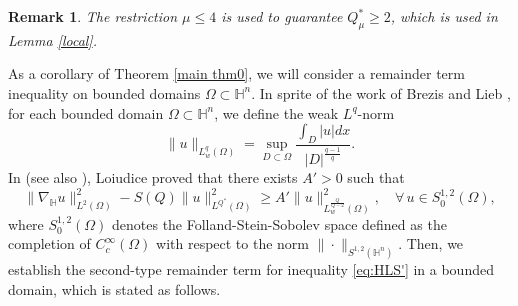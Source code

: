 \documentclass[11pt]{article}
\newtheorem{remark}{Remark}[section]
\begin{document}

\begin{remark}
{\rm The restriction $\mu\leq 4$ is used to guarantee $Q_\mu^*\geq 2$, which is used in Lemma \ref{local}.}
\end{remark}




As a corollary of Theorem \ref{main thm0}, we will consider a remainder term inequality on bounded domains $\Omega\subset \mathbb{H}^n$. In sprite of the work of Brezis and Lieb \cite{BL85}, for each bounded domain $\Omega\subset \mathbb{H}^n$, we define the weak $L^q$-norm
\begin{equation}\label{wen}
  \|u\|_{L^q_w(\Omega)}=\sup\limits_{D\subset \Omega}\frac{\int_{D}|u|dx}{|D|^{\frac{q-1}{q}}}.
\end{equation}
In \cite{L06} (see also \cite{L05}), Loiudice  proved that there exists $A'>0$ such that
\begin{equation*}
  \|\nabla_\mathbb{H} u\|_{L^{2}(\Omega)}^{2}-S(Q)\|u\|_{L^{Q^{\ast}}(\Omega)}^{2}\geq A'  \|u\|_{L^{\frac{Q}{Q-2}}_w(\Omega)}^2,
  \quad \forall \, u\in{S}_0^{1,2}(\Omega),
\end{equation*}
where $S_0^{1,2}(\Omega)$ denotes the Folland-Stein-Sobolev
space defined as the completion of $C_c^\infty(\Omega)$ with respect to the norm $\|\cdot\|_{S^{1,2}(\mathbb{H}^n)}$.
Then, we establish the second-type remainder term for inequality \eqref{eq:HLS'} in a bounded domain, which is stated
as follows.
\end{document}
